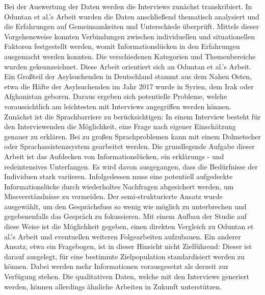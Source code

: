 \newline
Bei der Auswertung der Daten werden die Interviews zun\"achst transkribiert. In Oduntan et al.'s Arbeit wurden die Daten anschlie\ss{}end thematisch analysiert und die Erfahrungen auf Gemeinsamkeiten und Unterschiede \"uberpr\"uft. Mittels dieser Vorgehensweise konnten Verbindungen zwischen individuellen und situationellen Faktoren festgestellt werden, womit Informationsl\"ucken in den Erfahrungen ausgemacht werden konnten. Die verschiedenen Kategorien und Themenbereiche wurden gekennzeichnet.\cite{oduntan2017investigating} Diese Arbeit orientiert sich an Oduntan et al.'s Arbeit.
\newline
Ein Gro\ss{}teil der Asylsuchenden in Deutschland stammt aus dem Nahen Osten, etwa die H\"afte der Asylsuchenden im Jahr 2017 wurde in Syrien, dem Irak oder Afghanistan geboren\cite{asylum2017seekers}. Daraus ergeben sich potentielle Probleme, welche voraussichtlich am leichtesten mit Interviews angegriffen werden k\"onnen.
Zun\"achst ist die Sprachbarriere zu ber\"ucksichtigen: In einem Interview besteht f\"ur den Interviewenden die M\"oglichkeit, eine Frage nach eigener Einsch\"atzung genauer zu erkl\"aren. Bei zu gro\ss{}en Sprachproblemen kann mit einem Dolmetscher oder Sprachassistenzsystem gearbeitet werden.\newline
Die grundlegende Aufgabe dieser Arbeit ist das Aufdecken von Informationsl\"ucken, ein erkl\"arungs - und redeintensives Unterfangen. Es wird davon ausgegangen, dass die Bed\"urfnisse der Individuen stark variieren. Infolgedessen muss eine potentiell aufgedeckte Informationsl\"ucke durch wiederholtes Nachfragen abgesichert werden, um Missverst\"andnisse zu vermeiden.\newline
Der semi-strukturierte Ansatz wurde ausgew\"ahlt, um den Gespr\"achsfuss so wenig wie m\"oglich zu unterbrechen und gegebenenfalls das Gespr\"ach zu fokussieren.\newline
Mit einem Aufbau der Studie auf diese Weise ist die M\"oglichkeit gegeben, einen direkten Vergleich zu Oduntan et al.'s Arbeit und eventuellen weiteren Folgearbeiten aufzubauen.\newline
Ein anderer Ansatz, etwa ein Fragebogen, ist in dieser Hinsicht nicht Zielf\"uhrend: Dieser ist darauf ausgelegt, f\"ur eine bestimmte Zielpopulation standardisiert werden zu k\"onnen. Dabei werden mehr Informationen vorausgesetzt als derzeit zur Verf\"ugung stehen.\newline
Die qualitativen Daten, welche mit den Interviews generiert werden, k\"onnen allerdings \"ahnliche Arbeiten in Zukunft unterst\"utzen.\newline




